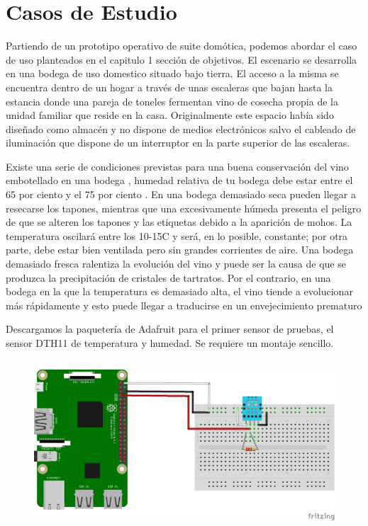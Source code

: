 \cleardoublepage

\chapter{Casos de Estudio}
\label{makereference6}

Partiendo de un prototipo operativo de suite domótica, podemos abordar el caso de uso planteados en el capitulo 1 sección de objetivos. El escenario se desarrolla en una bodega de uso domestico situado bajo tierra. El acceso a la misma se encuentra dentro de un hogar a través de unas escaleras que bajan hasta la estancia donde una pareja de toneles fermentan vino de cosecha propia de la unidad familiar que reside en la casa. Originalmente este espacio había sido diseñado como almacén y no dispone de medios electrónicos salvo el cableado de iluminación que dispone de un interruptor en la parte superior de las escaleras.

Existe una serie de condiciones previstas para una buena conservación del vino embotellado en una bodega , humedad relativa de tu bodega debe estar entre el 65 por ciento y el 75 por ciento . En una bodega demasiado seca pueden llegar a resecarse los tapones, mientras que una excesivamente húmeda presenta el peligro de que se alteren los tapones y las etiquetas debido a la aparición de mohos.
La temperatura oscilará entre los 10-15C y será, en lo posible, constante; por otra parte, debe estar bien ventilada pero sin grandes corrientes de aire. Una bodega demasiado fresca ralentiza la evolución del vino y puede ser la causa de que se produzca la precipitación de cristales de tartratos. Por el contrario, en una bodega en la que la temperatura es demasiado alta, el vino tiende a evolucionar más rápidamente y esto puede llegar a traducirse en un envejecimiento prematuro

Descargamos la paquetería de Adafruit para el primer sensor de pruebas, el sensor DTH11 de temperatura y humedad.
Se requiere un montaje sencillo.
\begin{figure}[hbt!]
\centering
\includegraphics[height=2.5in]{figures/nodo_1.png}
\end{figure}

